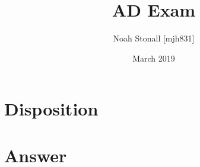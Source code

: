 \documentclass{article}
\title{AD Exam}
\author{Noah Stonall [mjh831]}
\date{March 2019}
\begin{document}
\section*{Disposition}


\section*{Answer}

\end{document}
